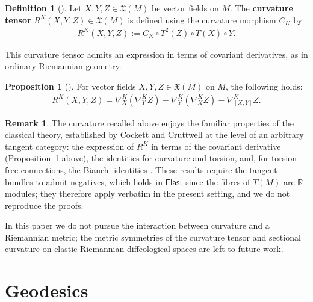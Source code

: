 \documentclass{amsart}
\newcommand{\R}{\mathbb{R}}
\theoremstyle{definition}
\newtheorem{defn}[thm]{Definition}
\newtheorem{rem}[thm]{Remark}
\newtheorem{prop}[thm]{Proposition}
\begin{document}
\begin{defn}[{\cite[Definition~3.21]{CC17}}]\label{def:curvature-tensor}
  Let $X, Y, Z \in \mathfrak{X}(M)$ be vector fields on $M$.
  The \textbf{curvature tensor} $R^K(X,Y,Z) \in \mathfrak{X}(M)$
  is defined using the curvature morphism $C_K$ by
  \begin{align*}
    R^K(X,Y,Z) := C_K \circ T^2(Z) \circ T(X) \circ Y.
  \end{align*}
\end{defn}


This curvature tensor admits an expression in terms of covariant derivatives,
as in ordinary Riemannian geometry.

\begin{prop}[{\cite[Proposition~3.22]{CC17}}]\label{prop:curvature-covariant-derivative}
  For vector fields $X, Y, Z \in \mathfrak{X}(M)$ on $M$, the following holds:
  \begin{align*}
    R^K(X,Y,Z)
      = \nabla^K_X (\nabla^K_Y Z)
        - \nabla^K_Y (\nabla^K_X Z)
        - \nabla^K_{[X,Y]} Z.
  \end{align*}
\end{prop}


\begin{rem}\label{rem:curvature-pending}
  The curvature recalled above enjoys the familiar properties of the classical theory, established by Cockett and Cruttwell at the level of an arbitrary tangent category: the expression of $R^K$ in terms of the covariant derivative (Proposition~\ref{prop:curvature-covariant-derivative} above), the identities for curvature and torsion, and, for torsion-free connections, the Bianchi identities \cite[Theorem 3.34]{CC17}. These results require the tangent
  bundles to admit negatives, which holds in $\mathsf{Elast}$ since the fibres of $T(M)$ are $\R$-modules; they therefore apply verbatim in the present setting, and we do not reproduce the proofs. 

  In this paper we do not pursue the interaction between curvature and a Riemannian metric; the metric symmetries of the curvature tensor and sectional curvature on elastic Riemannian diffeological spaces are left to future work.
\end{rem}

\section{Geodesics}\label{sec:geodesics}
\end{document}
